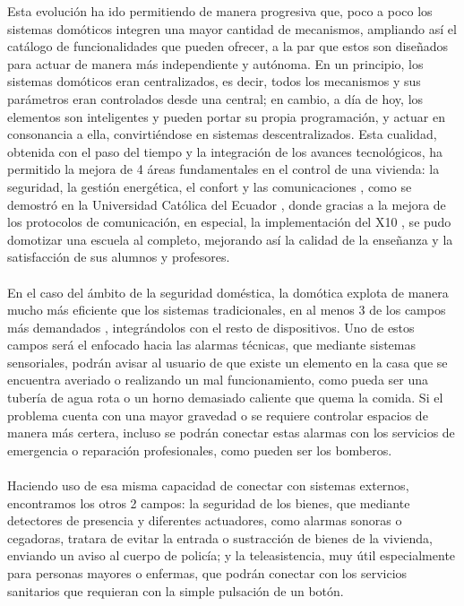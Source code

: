 Esta evolución ha ido permitiendo de manera progresiva que, poco a poco los sistemas domóticos integren una mayor cantidad de mecanismos, ampliando así el catálogo de funcionalidades que pueden ofrecer, a la par que estos son diseñados para actuar de manera más independiente y autónoma. En un principio, los sistemas domóticos eran centralizados, es decir, todos los mecanismos y sus parámetros eran controlados desde una central; en cambio, a día de hoy, los elementos son inteligentes y pueden portar su propia programación, y actuar en consonancia a ella, convirtiéndose en sistemas descentralizados. Esta cualidad, obtenida con el paso del tiempo y la integración de los avances tecnológicos, ha permitido la mejora de 4 áreas fundamentales en el control de una vivienda: la seguridad, la gestión energética, el confort y las comunicaciones  \cite{Andes:2011}, como se demostró en la Universidad Católica del Ecuador \cite{Ecuador:2017}, donde gracias a la mejora de los protocolos de comunicación, en especial, la implementación del X10 \cite{esther:2009}, se pudo domotizar una escuela al completo, mejorando así la calidad de la enseñanza y la satisfacción de sus alumnos y profesores.\\\\
En el caso del ámbito de la seguridad doméstica, la domótica explota de manera mucho más eficiente que los sistemas tradicionales, en al menos 3 de los campos más demandados \cite{iecor}, integrándolos con el resto de dispositivos. Uno de estos campos será el enfocado hacia las alarmas técnicas, que mediante sistemas sensoriales, podrán avisar al usuario de que existe un elemento en la casa que se encuentra averiado o realizando un mal funcionamiento, como pueda ser una tubería de agua rota o un horno demasiado caliente que quema la comida. Si el problema cuenta con una mayor gravedad o se requiere controlar espacios de manera más certera, incluso se podrán conectar estas alarmas con los servicios de emergencia o reparación profesionales, como pueden ser los bomberos. \\\\
Haciendo uso de esa misma capacidad de conectar con sistemas externos, encontramos los otros 2 campos: la seguridad de los bienes, que mediante detectores de presencia y diferentes actuadores, como alarmas sonoras o cegadoras, tratara de evitar la entrada o sustracción de bienes de la vivienda, enviando un aviso al cuerpo de policía; y la teleasistencia, muy útil especialmente para personas mayores o enfermas, que podrán conectar con los servicios sanitarios que requieran con la simple pulsación de un botón.\\\\
